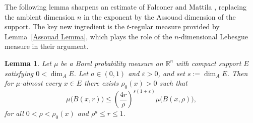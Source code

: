\documentclass[12pt]{amsart}
\newtheorem{lemma}[theorem]{Lemma}
\theoremstyle{definition}
\theoremstyle{remark}
\numberwithin{equation}{section}
\begin{document}
The following lemma sharpens an estimate of Falconer and Mattila
\cite{falconer1996packing}, replacing the ambient dimension $n$ in the
exponent by the Assouad dimension of the support. The key new ingredient
is the $t$-regular measure provided by Lemma~\ref{Assouad Lemma}, which
plays the role of the $n$-dimensional Lebesgue measure in their argument.

\begin{lemma}\label{lem:assouad_measure_growth}
Let $\mu$ be a Borel probability measure on $\mathbb{R}^n$ with compact
support $E$ satisfying $0<\dim_A E$. Let $a\in(0,1)$ and $\varepsilon>0$,
and set $s:=\dim_A E$. Then for $\mu$-almost every $x\in E$ there exists
$\rho_0(x)>0$ such that
\begin{equation}\label{eq:ball_growth}
\mu\bigl(B(x,r)\bigr)
\le \left(\frac{4r}{\rho}\right)^{s(1+\varepsilon)}\mu\bigl(B(x,\rho)\bigr),
\end{equation}
for all $0<\rho<\rho_0(x)$ and $\rho^{a}\le r\le 1.$\end{lemma}
\end{document}
